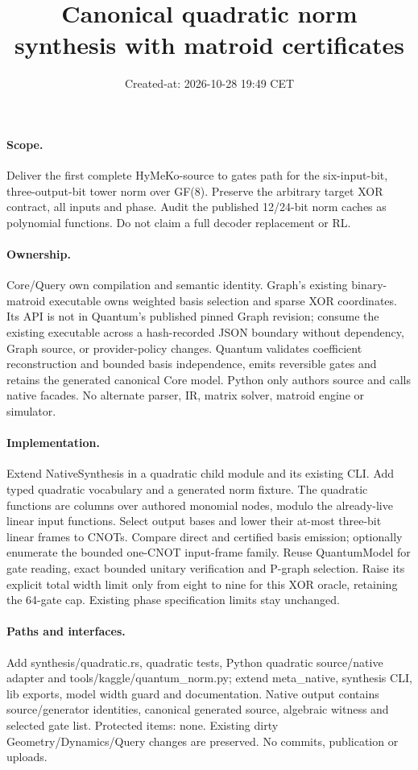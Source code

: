 \documentclass{article}
\title{Canonical quadratic norm synthesis with matroid certificates}
\date{Created-at: 2026-10-28 19:49 CET}
\begin{document}
\maketitle
\paragraph{Scope.} Deliver the first complete HyMeKo-source to gates path for
the six-input-bit, three-output-bit tower norm over GF(8). Preserve the arbitrary
target XOR contract, all inputs and phase. Audit the published 12/24-bit norm
caches as polynomial functions. Do not claim a full decoder replacement or RL.
\paragraph{Ownership.} Core/Query own compilation and semantic identity. Graph's
existing binary-matroid executable owns weighted basis selection and sparse XOR
coordinates. Its API is not in Quantum's published pinned Graph revision; consume
the existing executable across a hash-recorded JSON boundary without dependency,
Graph source, or provider-policy changes. Quantum validates coefficient
reconstruction and bounded basis independence, emits reversible gates and retains
the generated canonical Core model. Python only authors source and calls native
facades. No alternate parser, IR, matrix solver, matroid engine or simulator.
\paragraph{Implementation.} Extend NativeSynthesis in a quadratic child module
and its existing CLI. Add typed quadratic vocabulary and a generated norm fixture.
The quadratic functions are columns over authored monomial nodes, modulo the
already-live linear input functions. Select output bases and lower their at-most
three-bit linear frames to CNOTs. Compare direct and certified basis emission;
optionally enumerate the bounded one-CNOT input-frame family. Reuse QuantumModel
for gate reading, exact bounded unitary verification and P-graph selection. Raise
its explicit total width limit only from eight to nine for this XOR oracle,
retaining the 64-gate cap. Existing phase specification limits stay unchanged.
\paragraph{Paths and interfaces.} Add synthesis/quadratic.rs, quadratic tests,
Python quadratic source/native adapter and tools/kaggle/quantum\_norm.py; extend
meta\_native, synthesis CLI, lib exports, model width guard and documentation.
Native output contains source/generator identities, canonical generated source,
algebraic witness and selected gate list. Protected items: none. Existing dirty
Geometry/Dynamics/Query changes are preserved. No commits, publication or uploads.
\end{document}
